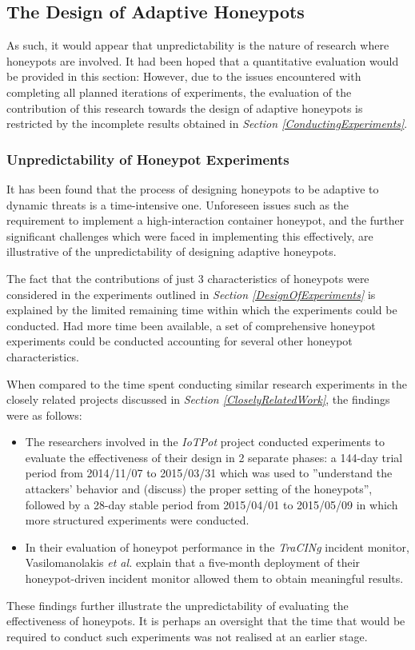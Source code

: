 \subsection{The Design of Adaptive Honeypots}
As such, it would appear that unpredictability is the nature of research where honeypots are involved. It had been hoped that a quantitative evaluation would be provided in this section: However, due to the issues encountered with completing all planned iterations of experiments, the evaluation of the contribution of this research towards the design of adaptive honeypots is restricted by the incomplete results obtained in \textit{Section \ref{ConductingExperiments}}.

\subsubsection{Unpredictability of Honeypot Experiments}
It has been found that the process of designing honeypots to be adaptive to dynamic threats is a time-intensive one. Unforeseen issues such as the requirement to implement a high-interaction container honeypot, and the further significant challenges which were faced in implementing this effectively, are illustrative of the unpredictability of designing adaptive honeypots. 

The fact that the contributions of just 3 characteristics of honeypots were considered in the experiments outlined in \textit{Section \ref{DesignOfExperiments}} is explained by the limited remaining time within which the experiments could be conducted. Had more time been available, a set of comprehensive honeypot experiments could be conducted accounting for several other honeypot characteristics. 

When compared to the time spent conducting similar research experiments in the closely related projects discussed in \textit{Section \ref{CloselyRelatedWork}}, the findings were as follows:
\begin{itemize}
\item The researchers involved in the \textit{IoTPot} project conducted experiments to evaluate the effectiveness of their design in 2 separate phases: a 144-day trial period from 2014/11/07 to 2015/03/31 which was used to ''understand the attackers' behavior and (discuss) the proper setting of the honeypots'', followed by a 28-day stable period from 2015/04/01 to 2015/05/09 in which more structured experiments were conducted. \cite{IoTPot2016}
\item In their evaluation of honeypot performance in the \textit{TraCINg} incident monitor, Vasilomanolakis \textit{et al.} explain that a five-month deployment of their honeypot-driven incident monitor allowed them to obtain meaningful results.  \cite{Vasilomanolakis}
\end{itemize}
These findings further illustrate the unpredictability of evaluating the effectiveness of honeypots. It is perhaps an oversight that the time that would be required to conduct such experiments was not realised at an earlier stage.

